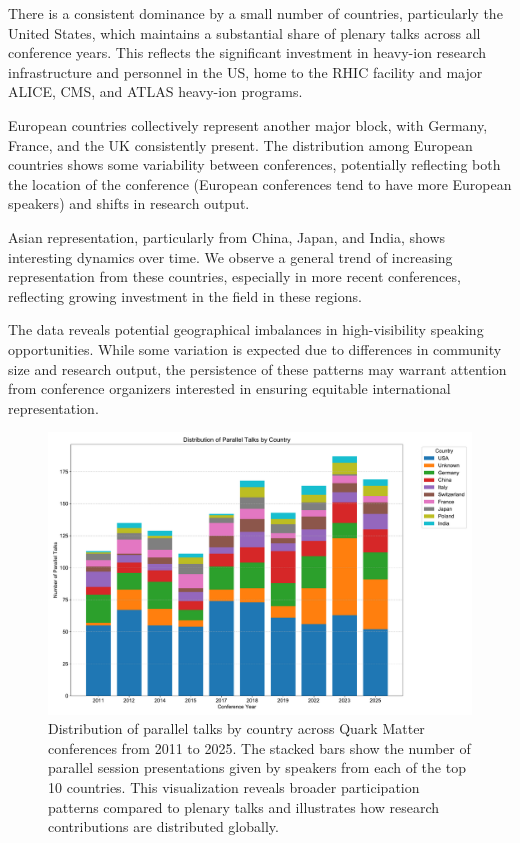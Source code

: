 \documentclass[a4paper,11pt]{article}
\begin{document}
There is a consistent dominance by a small number of countries, particularly the United States, which maintains a substantial share of plenary talks across all conference years. This reflects the significant investment in heavy-ion research infrastructure and personnel in the US, home to the RHIC facility and major ALICE, CMS, and ATLAS heavy-ion programs.

European countries collectively represent another major block, with Germany, France, and the UK consistently present. The distribution among European countries shows some variability between conferences, potentially reflecting both the location of the conference (European conferences tend to have more European speakers) and shifts in research output.

Asian representation, particularly from China, Japan, and India, shows interesting dynamics over time. We observe a general trend of increasing representation from these countries, especially in more recent conferences, reflecting growing investment in the field in these regions.

The data reveals potential geographical imbalances in high-visibility speaking opportunities. While some variation is expected due to differences in community size and research output, the persistence of these patterns may warrant attention from conference organizers interested in ensuring equitable international representation.

\begin{figure}[H]
\centering
\includegraphics[width=\textwidth]{figures/parallel_talks_by_country.pdf}
\caption{Distribution of parallel talks by country across Quark Matter conferences from 2011 to 2025. The stacked bars show the number of parallel session presentations given by speakers from each of the top 10 countries. This visualization reveals broader participation patterns compared to plenary talks and illustrates how research contributions are distributed globally.}
\label{fig:country_parallel}
\end{figure}
\end{document}
